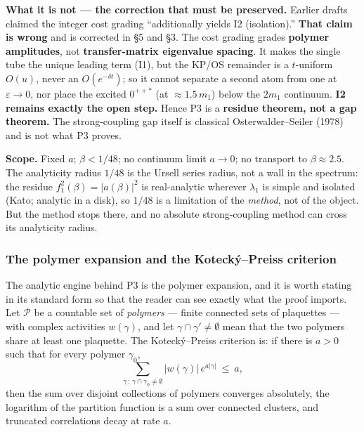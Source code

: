 \textbf{What it is not --- the correction that must be preserved.} Earlier drafts claimed the
integer cost grading ``additionally yields I2 (isolation).'' \textbf{That claim is wrong} and is
corrected in  \S5 and  \S3. The cost grading
grades \textbf{polymer amplitudes}, not \textbf{transfer-matrix eigenvalue spacing}. It makes the
single tube the unique leading term (I1), but the KP/OS remainder is a $t$-uniform $O(u)$, never
an $O(e^{-\delta t})$; so it cannot separate a second atom from one at $\varepsilon\to0$, nor
place the excited $0^{++*}$ (at $\approx1.5\,m_1$) below the $2m_1$ continuum. \textbf{I2 remains
exactly the open step.} Hence P3 is a \textbf{residue theorem, not a gap theorem.} The
strong-coupling gap itself is classical Osterwalder--Seiler (1978) and is not what P3 proves.

\textbf{Scope.} Fixed $a$; $\beta<1/48$; no continuum limit $a\to0$; no transport to
$\beta\approx2.5$. The analyticity radius $1/48$ is the Ursell series radius, not a wall in the
spectrum: the residue $f_1^2(\beta)=|a(\beta)|^2$ is real-analytic wherever $\lambda_1$ is simple
and isolated (Kato; analytic in a disk), so $1/48$ is a limitation of the \emph{method}, not of
the object. But the method stops there, and no absolute strong-coupling method can cross its
analyticity radius.

\subsubsection{The polymer expansion and the Koteck\'y--Preiss criterion}

The analytic engine behind P3 is the polymer expansion, and it is worth stating in its standard
form so that the reader can see exactly what the proof imports. Let $\mathcal P$ be a countable
set of \emph{polymers} --- finite connected sets of plaquettes --- with complex activities
$w(\gamma)$, and let $\gamma\cap\gamma'\ne\emptyset$ mean that the two polymers share at least
one plaquette. The Koteck\'y--Preiss criterion is: if there is $a>0$ such that for every polymer
$\gamma_0$,
\begin{equation}
\sum_{\gamma\,:\,\gamma\cap\gamma_0\ne\emptyset}|w(\gamma)|\,e^{a|\gamma|}\ \le\ a ,
\label{eq:kp}
\end{equation}
then the sum over disjoint collections of polymers converges absolutely, the logarithm of the
partition function is a sum over connected clusters, and truncated correlations decay at rate
$a$.

